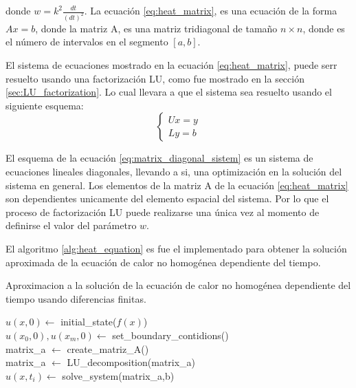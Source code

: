 donde $w=k^2\frac{dt}{(dt)^2}$. La ecuación \ref{eq:heat_matrix}, es una ecuación de la forma $Ax=b$, donde la matriz A, es una matriz tridiagonal de tamaño $n \times n$, donde  es el número de intervalos en el segmento $[a,b]$.

El sistema de ecuaciones mostrado en la ecuación \ref{eq:heat_matrix}, puede serr resuelto usando una factorización LU, como fue mostrado en la sección \ref{sec:LU_factorization}. Lo cual llevara a que el sistema sea resuelto usando el siguiente esquema:
\begin{equation}
    \begin{cases}
        Ux=y \\
        Ly=b
    \end{cases} \label{eq:matrix_diagonal_sistem}
\end{equation}

El esquema de la ecuación \ref{eq:matrix_diagonal_sistem} es un sistema de ecuaciones lineales diagonales, llevando a si, una optimización en la solución del sistema en general. Los elementos de la matriz A de la ecuación \ref{eq:heat_matrix} son dependientes unicamente del elemento espacial del sistema. Por lo que el proceso de factorización LU puede realizarse una única vez al momento de definirse el valor del parámetro $w$.

El algoritmo \ref{alg:heat_equation} es fue el implementado para obtener la solución aproximada de la ecuación de calor no homogénea dependiente del tiempo.

\begin{algorithm}[H]
    \caption{Aproximacion a la solución de la ecuación de calor no homogénea dependiente del tiempo usando diferencias finitas.}
    \label{alg:heat_equation}
    $u(x,0) \gets$ initial\_state($f(x)$) \\
    $u(x_0,0),u(x_m,0) \gets$ set\_boundary\_contidions()\\
    matrix\_a $\gets$ create\_matriz\_A()\\
    matrix\_a $\gets$ LU\_decomposition(matrix\_a)\\
    {
    $u(x,t_i) \gets$ solve\_system(matrix\_a,b)
    }
\end{algorithm}